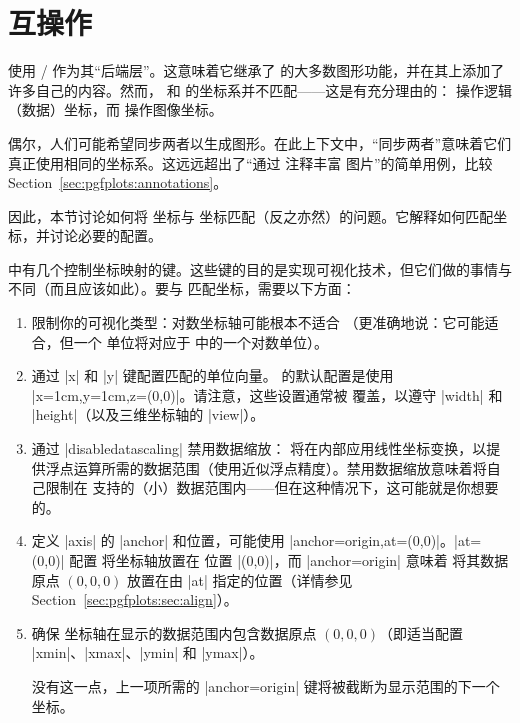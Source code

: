 
\section{\tikzname{} 互操作}
\label{sec:pgfplots:tikz:interoperability}

\PGFPlots{} 使用 \Tikz{}/\pgfname{} 作为其“后端层”。这意味着它继承了 \Tikz{} 的大多数图形功能，并在其上添加了许多自己的内容。然而，\Tikz{} 和 \PGFPlots{} 的坐标系并不匹配——这是有充分理由的：\PGFPlots{} 操作逻辑（数据）坐标，而 \Tikz{} 操作图像坐标。

偶尔，人们可能希望同步两者以生成图形。在此上下文中，“同步两者”意味着它们真正使用相同的坐标系。这远远超出了“通过 \Tikz{} 注释丰富 \PGFPlots{} 图片”的简单用例，比较 Section~\ref{sec:pgfplots:annotations}。

因此，本节讨论如何将 \Tikz{} 坐标与 \PGFPlots{} 坐标匹配（反之亦然）的问题。它解释如何匹配坐标，并讨论必要的配置。

\PGFPlots{} 中有几个控制坐标映射的键。这些键的目的是实现可视化技术，但它们做的事情与 \Tikz{} 不同（而且应该如此）。要与 \Tikz{} 匹配坐标，需要以下方面：
%
\begin{enumerate}
    \item 限制你的可视化类型：对数坐标轴可能根本不适合 \Tikz{}（更准确地说：它可能适合，但一个 \Tikz{} 单位将对应于 \PGFPlots 中的一个对数单位）。
    \item 通过 |x| 和 |y| 键配置匹配的单位向量。\Tikz{} 的默认配置是使用 |x=1cm,y=1cm,z={(0,0)}|。请注意，这些设置通常被 \PGFPlots{} 覆盖，以遵守 |width| 和 |height|（以及三维坐标轴的 |view|）。
    \item 通过 |disabledatascaling| 禁用数据缩放：\PGFPlots{} 将在内部应用线性坐标变换，以提供浮点运算所需的数据范围（使用近似浮点精度）。禁用数据缩放意味着将自己限制在 \Tikz{} 支持的（小）数据范围内——但在这种情况下，这可能就是你想要的。
    \item 定义 |axis| 的 |anchor| 和位置，可能使用 |anchor=origin,at={(0,0)}|。|at={(0,0)}| 配置 \PGFPlots{} 将坐标轴放置在 \Tikz{} 位置 |(0,0)|，而 |anchor=origin| 意味着 \PGFPlots{} 将其数据原点 $(0,0,0)$ 放置在由 |at| 指定的位置（详情参见 Section~\ref{sec:pgfplots:sec:align}）。
    \item 确保 \PGFPlots{} 坐标轴在显示的数据范围内包含数据原点 $(0,0,0)$（即适当配置 |xmin|、|xmax|、|ymin| 和 |ymax|）。

        没有这一点，上一项所需的 |anchor=origin| 键将被截断为显示范围的下一个坐标。
\end{enumerate}


